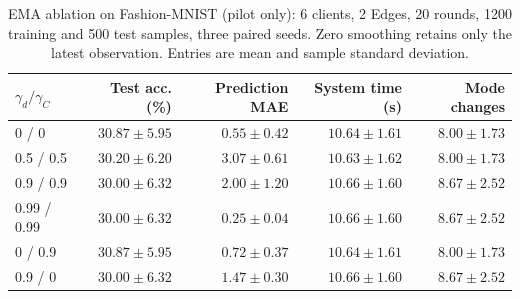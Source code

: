 \begin{table}[t]
\centering
\scriptsize
\caption{EMA ablation on Fashion-MNIST (pilot only): 6 clients, 2 Edges, 20 rounds, 1200 training and 500 test samples, three paired seeds. Zero smoothing retains only the latest observation. Entries are mean and sample standard deviation.}
\label{tab:verified_pilot_ema}
\begin{tabular}{lrrrr}
\toprule
$\gamma_d/\gamma_C$ & Test acc. (\%) & Prediction MAE & System time (s) & Mode changes \\
\midrule
0 / 0 & $30.87\pm5.95$ & $0.55\pm0.42$ & $10.64\pm1.61$ & $8.00\pm1.73$ \\
0.5 / 0.5 & $30.20\pm6.20$ & $3.07\pm0.61$ & $10.63\pm1.62$ & $8.00\pm1.73$ \\
0.9 / 0.9 & $30.00\pm6.32$ & $2.00\pm1.20$ & $10.66\pm1.60$ & $8.67\pm2.52$ \\
0.99 / 0.99 & $30.00\pm6.32$ & $0.25\pm0.04$ & $10.66\pm1.60$ & $8.67\pm2.52$ \\
0 / 0.9 & $30.87\pm5.95$ & $0.72\pm0.37$ & $10.64\pm1.61$ & $8.00\pm1.73$ \\
0.9 / 0 & $30.00\pm6.32$ & $1.47\pm0.30$ & $10.66\pm1.60$ & $8.67\pm2.52$ \\
\bottomrule
\end{tabular}
\end{table}
